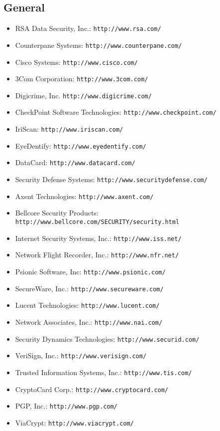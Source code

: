 \subsection{General}
\begin{itemize}
\item RSA Data Security, Inc.: {\tt http://www.rsa.com/}
\item Counterpane Systems: {\tt http://www.counterpane.com/}
\item Cisco Systems: {\tt http://www.cisco.com/}
\item 3Com Corporation: {\tt http://www.3com.com/}
\item Digicrime, Inc. {\tt http://www.digicrime.com/}
\item CheckPoint Software Technologies: {\tt http://www.checkpoint.com/}
\item IriScan: {\tt http://www.iriscan.com/}
\item EyeDentify: {\tt http://www.eyedentify.com/}
\item DataCard: {\tt http://www.datacard.com/}
\item Security Defense Systems: {\tt http://www.securitydefense.com/}
\item Axent Technologies: {\tt http://www.axent.com/}
\item Bellcore Security Products: {\tt http://www.bellcore.com/SECURITY/security.html}
\item Internet Security Systems, Inc.: {\tt http://www.iss.net/}
\item Network Flight Recorder, Inc.: {\tt http://www.nfr.net/}
\item Psionic Software, Inc: {\tt http://www.psionic.com/}
\item SecureWare, Inc.: {\tt http://www.secureware.com/}
\item Lucent Technologies: {\tt http://www.lucent.com/}
\item Network Associates, Inc.: {\tt http://www.nai.com/}
\item Security Dynamics Technologies: {\tt http://www.securid.com/}
\item VeriSign, Inc.: {\tt http://www.verisign.com/}
\item Trusted Information Systems, Inc.: {\tt http://www.tis.com/}
\item CryptoCard Corp.: {\tt http://www.cryptocard.com/}
\item PGP, Inc.: {\tt http://www.pgp.com/}
\item ViaCrypt: {\tt http://www.viacrypt.com/}
\end{itemize}
